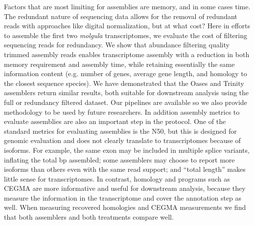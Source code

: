 Factors that are most limiting for assemblies are memory, and in some cases time. The redundant nature of sequencing data allows for the removal of redundant reads with approaches like digital normalization, but at what cost? Here in efforts to assemble the first two \textit{molgula} transcriptomes, we evaluate the cost of filtering sequencing reads for redundancy. We show that abundance filtering quality trimmed assembly reads enables transcriptome assembly with a reduction in both memory requirement and assembly time, while retaining essentially the same information content (e.g. number of genes, average gene length, and homology to the closest sequence species). We have demonstrated that the Oases and Trinity assemblers return similar results, both suitable for downstream analysis using the full or redundancy filtered dataset. Our pipelines are available so we also provide methodology to be used by future researchers. In addition assembly metrics to evaluate assemblies are also an important step in the protocol. One of the standard metrics for evaluating assemblies is the N50, but this is designed for genomic evaluation and does not clearly translate to transcriptomes because of isoforms. For example, the same exon may be included in multiple splice variants, inflating the total bp assembled; some assemblers may choose to report more isoforms than others even with the same read support; and ``total length'' makes little sense for transcriptomes. In contrast, homology and programs such as CEGMA are more informative and useful for downstream analysis, because they measure the information in the transcriptome and cover the annotation step as well. When measuring recovered homologies and CEGMA measurements we find that both assemblers and both treatments compare well. %

